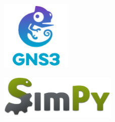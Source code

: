 \documentclass[compress]{beamer}
\begin{document}
\begin{frame}
\begin{columns}
\begin{column}{0.5\textwidth}
\begin{figure}
                    \centering
                    \includegraphics[width=0.3\textwidth]{img/GNS3_logo.png}
                \end{figure}
                \begin{figure}
                    \centering
                    \includegraphics[width=0.5\textwidth]{img/SimPy.png}
                \end{figure}
            \end{column}
        \end{columns}
    \end{frame}
\end{document}
